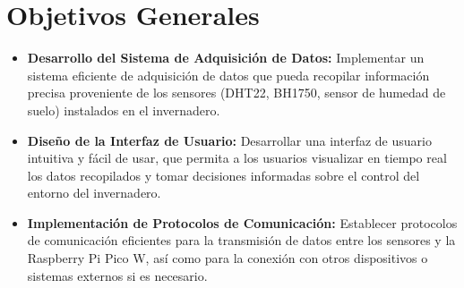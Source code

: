 \section{Objetivos Generales}
\begin{itemize}
\item \textbf{Desarrollo del Sistema de Adquisición de Datos:}
Implementar un sistema eficiente de adquisición de datos que pueda recopilar información precisa proveniente de los sensores (DHT22, BH1750, sensor de humedad de suelo) instalados en el invernadero.
\item \textbf{Diseño de la Interfaz de Usuario:}
Desarrollar una interfaz de usuario intuitiva y fácil de usar, que permita a los usuarios visualizar en tiempo real los datos recopilados y tomar decisiones informadas sobre el control del entorno del invernadero.
\item \textbf{Implementación de Protocolos de Comunicación:}
Establecer protocolos de comunicación eficientes para la transmisión de datos entre los sensores y la Raspberry Pi Pico W, así como para la conexión con otros dispositivos o sistemas externos si es necesario.
\end{itemize}
\pagebreak

